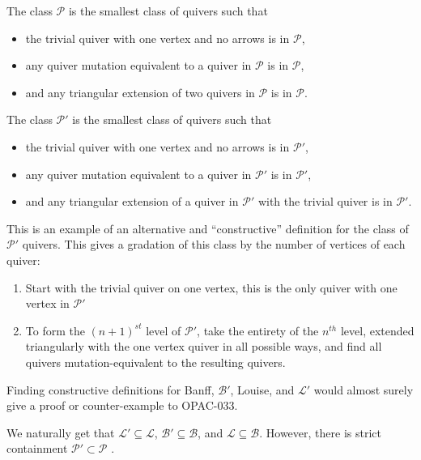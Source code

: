 \documentclass[ALCO,Unicode]{cedram}
\newcommand{\BB}{\mathcal{B}}
\newcommand{\PP}{\mathcal{P}}
\newcommand{\LL}{\mathcal{L}}
\begin{document}
 \begin{defi}\label{def-P}
    The class $\PP$ is the smallest class of quivers such that 
    \begin{itemize}
        \item the trivial quiver with one vertex and no arrows is in $\PP$,
        \item any quiver mutation equivalent to a quiver in $\PP$ is in $\PP$, 
        \item and any triangular extension of two quivers in $\PP$ is in $\PP$.
    \end{itemize}
 \end{defi}

 \begin{defi}\label{def-Pprime}
    The class $\PP'$ is the smallest class of quivers such that 
    \begin{itemize}
        \item the trivial quiver with one vertex and no arrows is in $\PP'$,
        \item any quiver mutation equivalent to a quiver in $\PP'$ is in $\PP'$, 
        \item and any triangular extension of a quiver in $\PP'$ with the trivial quiver is in $\PP'$.
    \end{itemize}
 \end{defi}


\begin{exam}\label{exa-constructive}
    This is an example of an alternative and ``constructive'' definition for the class of $\PP'$ quivers. This gives a gradation of this class by the number of vertices of each quiver:
    \begin{enumerate}
        \item Start with the trivial quiver on one vertex, this is the only quiver with one vertex in $\PP'$
        \item To form the $(n+1)^{st}$ level of $\PP'$, take the entirety of the $n^{th}$ level, extended triangularly with the one vertex quiver in all possible ways, and find all quivers mutation-equivalent to the resulting quivers.
    \end{enumerate}
    Finding constructive definitions for Banff, $\BB'$, Louise, and $\LL'$ would almost surely give a proof or counter-example to OPAC-033.
\end{exam}


\begin{rema} \label{rmk-subclasses}
    We naturally get that $\LL' \subseteq \LL$, $\BB' \subseteq \BB$, and $\LL \subseteq \BB$.
    However, there is strict containment $\PP' \subset \PP$ \cite[Remark 4.21]{ladkani_cluster_2013}.
\end{rema}
\end{document}
